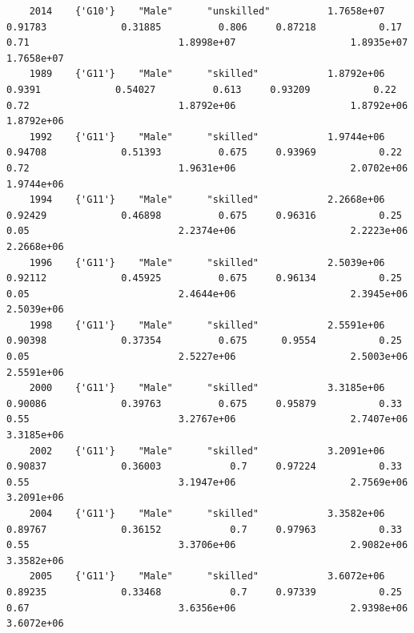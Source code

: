 \documentclass[
]{book}
\begin{document}
\begin{verbatim}
    2014    {'G10'}    "Male"      "unskilled"          1.7658e+07            0.91783             0.31885          0.806     0.87218           0.17               0.71                          1.8998e+07                    1.8935e+07             1.7658e+07        
    1989    {'G11'}    "Male"      "skilled"            1.8792e+06             0.9391             0.54027          0.613     0.93209           0.22               0.72                          1.8792e+06                    1.8792e+06             1.8792e+06        
    1992    {'G11'}    "Male"      "skilled"            1.9744e+06            0.94708             0.51393          0.675     0.93969           0.22               0.72                          1.9631e+06                    2.0702e+06             1.9744e+06        
    1994    {'G11'}    "Male"      "skilled"            2.2668e+06            0.92429             0.46898          0.675     0.96316           0.25               0.05                          2.2374e+06                    2.2223e+06             2.2668e+06        
    1996    {'G11'}    "Male"      "skilled"            2.5039e+06            0.92112             0.45925          0.675     0.96134           0.25               0.05                          2.4644e+06                    2.3945e+06             2.5039e+06        
    1998    {'G11'}    "Male"      "skilled"            2.5591e+06            0.90398             0.37354          0.675      0.9554           0.25               0.05                          2.5227e+06                    2.5003e+06             2.5591e+06        
    2000    {'G11'}    "Male"      "skilled"            3.3185e+06            0.90086             0.39763          0.675     0.95879           0.33               0.55                          3.2767e+06                    2.7407e+06             3.3185e+06        
    2002    {'G11'}    "Male"      "skilled"            3.2091e+06            0.90837             0.36003            0.7     0.97224           0.33               0.55                          3.1947e+06                    2.7569e+06             3.2091e+06        
    2004    {'G11'}    "Male"      "skilled"            3.3582e+06            0.89767             0.36152            0.7     0.97963           0.33               0.55                          3.3706e+06                    2.9082e+06             3.3582e+06        
    2005    {'G11'}    "Male"      "skilled"            3.6072e+06            0.89235             0.33468            0.7     0.97339           0.25               0.67                          3.6356e+06                    2.9398e+06             3.6072e+06        

\end{verbatim}
\end{document}
